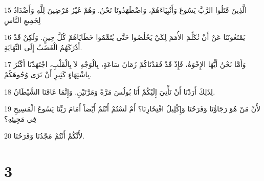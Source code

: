 \par 15 الَّذِينَ قَتَلُوا الرَّبَّ يَسُوعَ وَأَنْبِيَاءَهُمْ، وَاضْطَهَدُونَا نَحْنُ. وَهُمْ غَيْرُ مُرْضِينَ لِلَّهِ وَأَضْدَادٌ لِجَمِيعِ النَّاسِ
\par 16 يَمْنَعُونَنَا عَنْ أَنْ نُكَلِّمَ الأُمَمَ لِكَيْ يَخْلُصُوا حَتَّى يُتَمِّمُوا خَطَايَاهُمْ كُلَّ حِينٍ. وَلَكِنْ قَدْ أَدْرَكَهُمُ الْغَضَبُ إِلَى النِّهَايَةِ.
\par 17 وَأَمَّا نَحْنُ أَيُّهَا الإِخْوَةُ، فَإِذْ قَدْ فَقَدْنَاكُمْ زَمَانَ سَاعَةٍ، بِالْوَجْهِ لاَ بِالْقَلْبِ، اجْتَهَدْنَا أَكْثَرَ بِاشْتِهَاءٍ كَثِيرٍ أَنْ نَرَى وُجُوهَكُمْ.
\par 18 لِذَلِكَ أَرَدْنَا أَنْ نَأْتِيَ إِلَيْكُمْ أَنَا بُولُسَ مَرَّةً وَمَرَّتَيْنِ. وَإِنَّمَا عَاقَنَا الشَّيْطَانُ.
\par 19 لأَنْ مَنْ هُوَ رَجَاؤُنَا وَفَرَحُنَا وَإِكْلِيلُ افْتِخَارِنَا؟ أَمْ لَسْتُمْ أَنْتُمْ أَيْضاً أَمَامَ رَبِّنَا يَسُوعَ الْمَسِيحِ فِي مَجِيئِهِ؟
\par 20 لأَنَّكُمْ أَنْتُمْ مَجْدُنَا وَفَرَحُنَا.

\chapter{3}

